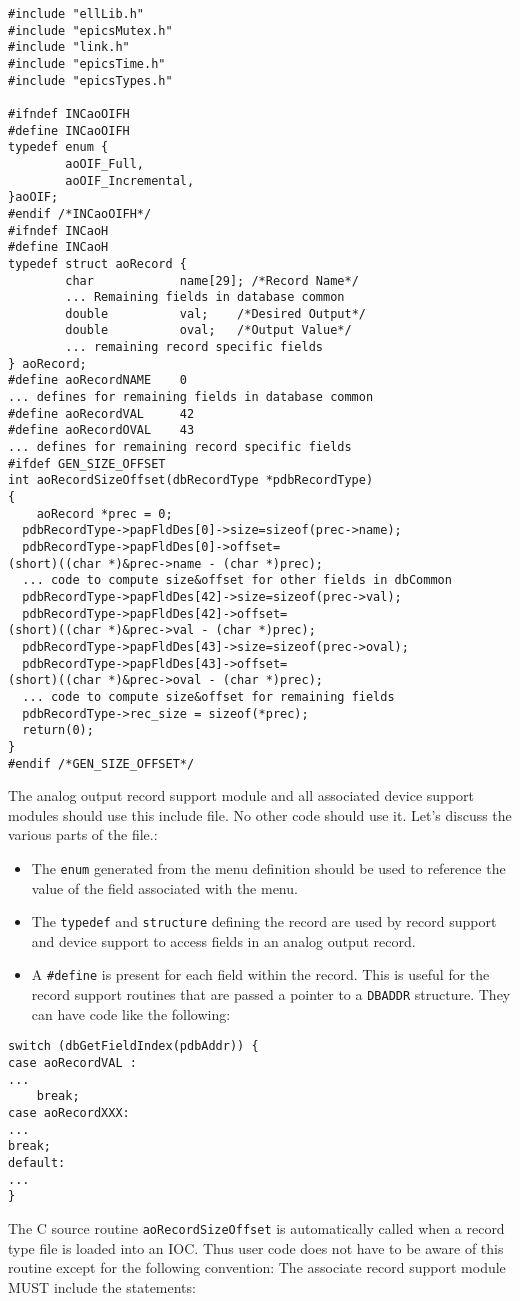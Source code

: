 \begin{verbatim}#include "ellLib.h"
#include "epicsMutex.h"
#include "link.h"
#include "epicsTime.h"
#include "epicsTypes.h"

#ifndef INCaoOIFH
#define INCaoOIFH
typedef enum {
        aoOIF_Full,
        aoOIF_Incremental,
}aoOIF;
#endif /*INCaoOIFH*/
#ifndef INCaoH
#define INCaoH
typedef struct aoRecord {
        char            name[29]; /*Record Name*/
        ... Remaining fields in database common
        double          val;    /*Desired Output*/
        double          oval;   /*Output Value*/
        ... remaining record specific fields
} aoRecord;
#define aoRecordNAME    0
... defines for remaining fields in database common
#define aoRecordVAL     42
#define aoRecordOVAL    43
... defines for remaining record specific fields
#ifdef GEN_SIZE_OFFSET
int aoRecordSizeOffset(dbRecordType *pdbRecordType)
{
    aoRecord *prec = 0;
  pdbRecordType->papFldDes[0]->size=sizeof(prec->name);
  pdbRecordType->papFldDes[0]->offset=
(short)((char *)&prec->name - (char *)prec);
  ... code to compute size&offset for other fields in dbCommon
  pdbRecordType->papFldDes[42]->size=sizeof(prec->val);
  pdbRecordType->papFldDes[42]->offset=
(short)((char *)&prec->val - (char *)prec);
  pdbRecordType->papFldDes[43]->size=sizeof(prec->oval);
  pdbRecordType->papFldDes[43]->offset=
(short)((char *)&prec->oval - (char *)prec);
  ... code to compute size&offset for remaining fields
  pdbRecordType->rec_size = sizeof(*prec);
  return(0);
}
#endif /*GEN_SIZE_OFFSET*/

\end{verbatim}The analog output record support module and all associated device support modules should use this include file. No other 
code should use it. Let's discuss the various parts of the file.:

\begin{itemize}\item The \verb|enum| generated from the menu definition should be used to reference the value of the field associated with the 
menu.

\item The \verb|typedef| and \verb|structure| defining the record are used by record support and device support to access fields 
in an analog output record.

\item A \verb|#define| is present for each field within the record. This is useful for the record support routines that are passed 
a pointer to a \verb|DBADDR| structure. They can have code like the following:

\end{itemize}\begin{verbatim}
switch (dbGetFieldIndex(pdbAddr)) {
case aoRecordVAL :
...
    break;
case aoRecordXXX:
...
break;
default:
...
}
\end{verbatim}The C source routine \verb|aoRecordSizeOffset| is automatically called when a record type file is loaded into an IOC. 
Thus user code does not have to be aware of this routine except for the following convention: The associate record 
support module MUST include the statements:

